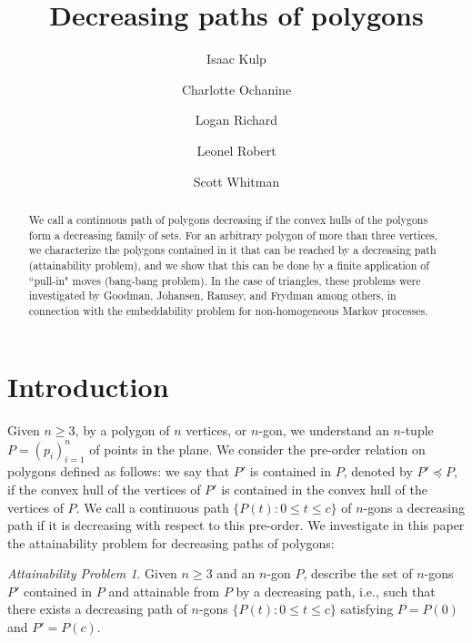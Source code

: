 \documentclass[11pt]{amsart}
\title{Decreasing paths of polygons}
\author[I. Kulp]{Isaac Kulp}
\author[C. Ochanine]{Charlotte Ochanine}
\author[L. Richard]{Logan Richard}
\author[L. Robert]{Leonel Robert}
\author[S. Whitman]{Scott Whitman}
\theoremstyle{remark}
\newtheorem*{AttnProblem}{Attainability Problem}
\numberwithin{equation}{section}
\renewcommand{\precsim}{\preccurlyeq}
\renewcommand{\leq}{\leqslant}
\renewcommand{\geq}{\geqslant}
\begin{document}
\begin{abstract}
We call a continuous path  of polygons decreasing if the convex hulls of the polygons form a decreasing family of sets. For an arbitrary  polygon of more than three vertices, we characterize the polygons contained in it that can be reached by a decreasing path (attainability problem), and we show that this can be done by a finite application of ``pull-in" moves (bang-bang problem).  
In the case of triangles, these problems were investigated by Goodman, Johansen, Ramsey, and Frydman among others, in connection with the embeddability 
problem for non-homogeneous Markov processes.
\end{abstract}


\maketitle
\setcounter{tocdepth}{1}
\tableofcontents

\section{Introduction}

Given $n\geq 3$, by a polygon of $n$ vertices, or $n$-gon, we understand  an $n$-tuple $P=(p_i)_{i=1}^n$ of points in the plane. We consider the  pre-order relation on polygons defined as follows: we say that $P'$ is contained in $P$, denoted by $P'\precsim P$,  if the convex hull of the vertices of $P'$  is contained in the convex hull of the vertices of $P$. We call a continuous path $\{P(t): 0\leq t\leq c\}$ of $n$-gons a decreasing path if it is decreasing with respect to this pre-order. We investigate in this paper the attainability problem for decreasing paths of polygons: 


\begin{AttnProblem}
\label{attainabilityproblem}
Given $n\geq 3$ and an $n$-gon $P$, describe the set of $n$-gons $P'$ contained in $P$  and attainable from $P$ by a decreasing path, i.e., such that there exists a decreasing path  of $n$-gons $\{P(t): 0\leq t\leq c\}$ satisfying $P=P(0)$ and $P'=P(c)$.
\end{AttnProblem}
\end{document}
